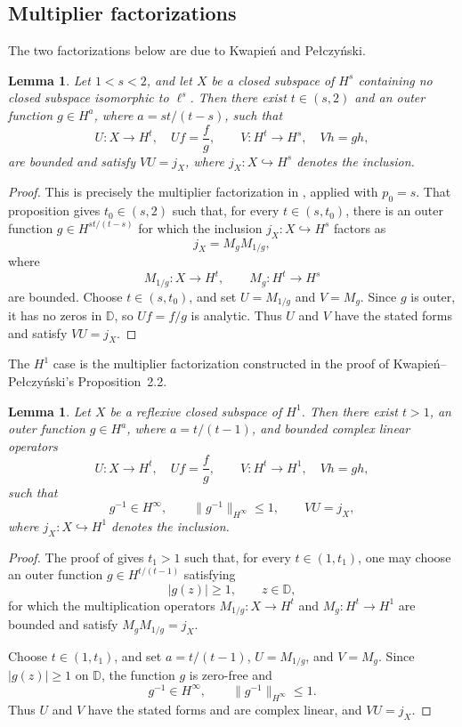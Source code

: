\documentclass[10pt,a4paper]{amsart}
\newtheorem{lemma}[theorem]{Lemma}
\newcommand{\D}{\mathbb{D}}
\begin{document}
\subsection{Multiplier factorizations}

The two factorizations below are due to
Kwapie\'n and Pe{\l}czy\'nski.

\begin{lemma}
\label{lem:kp-below2}
Let \(1<s<2\), and let \(X\) be a closed subspace of \(H^s\)
containing no closed subspace isomorphic to \(\ell^s\). Then there
exist \(t\in(s,2)\) and an outer function \(g\in H^a\), where \(a=st/(t-s)\), such that
\[
        U:X\to H^t,\quad Uf=\frac{f}{g},
        \qquad
        V:H^t\to H^s,\quad Vh=gh,
\]
are bounded and satisfy \(VU=j_X\), where
\(j_X:X\hookrightarrow H^s\) denotes the inclusion.
\end{lemma}

\begin{proof}
This is precisely the multiplier factorization in
\cite[Proposition~2.2a, p.~267]{KwapienPelczynski1976},
applied with \(p_0=s\). That proposition gives \(t_0\in(s,2)\)
such that, for every \(t\in(s,t_0)\), there is an outer function
\(g\in H^{st/(t-s)}
\)
for which the inclusion \(j_X:X\hookrightarrow H^s\) factors as
\[
        j_X=M_gM_{1/g},
\]
where
\[
        M_{1/g}:X\to H^t,
        \qquad
        M_g:H^t\to H^s
\]
are bounded. Choose \(t\in(s,t_0)\), and set
\(U=M_{1/g}\) and \(V=M_g\). Since \(g\) is outer, it has no zeros
in \(\D\), so \(Uf=f/g\) is analytic. Thus \(U\) and \(V\) have the
stated forms and satisfy \(VU=j_X\).
\end{proof}

The \(H^1\) case is the multiplier factorization constructed in the
proof of Kwapie\'n--Pe{\l}czy\'nski's Proposition~2.2.

\begin{lemma}
\label{lem:kp-H1}
Let \(X\) be a reflexive closed subspace of \(H^1\). Then there exist
\(t>1\), an outer function \(g\in H^a\), where
\(a=t/(t-1)\), and bounded complex linear operators
\[
        U:X\to H^t,\quad Uf=\frac{f}{g},
        \qquad
        V:H^t\to H^1,\quad Vh=gh,
\]
such that
\[
        g^{-1}\in H^\infty,
        \qquad
        \|g^{-1}\|_{H^\infty}\le1,
        \qquad
        VU=j_X,
\]
where \(j_X:X\hookrightarrow H^1\) denotes the inclusion.
\end{lemma}

\begin{proof}
The proof of
\cite[Proposition~2.2, pp.~265--266]{KwapienPelczynski1976}
gives \(t_1>1\) such that, for every \(t\in(1,t_1)\), one may choose
an outer function \(g\in H^{t/(t-1)}\) satisfying
\[
        |g(z)|\ge1,
        \qquad z\in\D,
\]
for which the multiplication operators
\(M_{1/g}:X\to H^t\) and \(M_g:H^t\to H^1\) are bounded and satisfy
\(M_gM_{1/g}=j_X\).

Choose \(t\in(1,t_1)\), and set
\(a=t/(t-1)\), \(U=M_{1/g}\), and \(V=M_g\).
Since \(|g(z)|\ge1\) on \(\D\), the function \(g\) is zero-free and
\[
        g^{-1}\in H^\infty,
        \qquad
        \|g^{-1}\|_{H^\infty}\le1.
\]
Thus \(U\) and \(V\) have the stated forms and are complex linear, and
\(VU=j_X\).
\end{proof}
\end{document}
